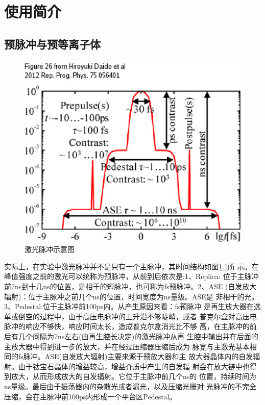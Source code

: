 

\chapter{使用简介}
\label{chap:guide}

\section{预脉冲与预等离子体}
\begin{figure}[!htbp]
  \centering
  \includegraphics[width=\MyFactor\textwidth]{Img/prepulse2012.eps}
  \caption{激光脉冲示意图}
  \label{fig:prepulse2012}
\end{figure}

实际上，在实验中激光脉冲并不是只有一个主脉冲，其时间结构如图\ref{fig:prepulse2012}所
示。在峰值强度之前的激光可以统称为预脉冲，从前到后依次是:1、Replica:
位于主脉冲前7ns到十几ns的位置，是相干的短脉冲，也可称为fs预脉冲。2、ASE
(自发放大辐射)：位于主脉冲之前几个ns的位置，时间宽度为ns量级。ASE是
非相干的光。3、Pedestal:位于主脉冲前100ps内。从产生原因来看：fs预脉冲
是再生放大器在选单或倒空的过程中，由于高压电脉冲的上升沿不够陡峭，或者
普克尔盒对高压电脉冲的响应不够快，响应时间太长，造成普克尔盒消光比不够
高，在主脉冲的前后有几个间隔为7ns左右(由再生腔长决定)的激光脉冲从再
生腔中输出并在后面的主放大器中得到进一步的放大，并在经过压缩器压缩后成为
脉宽与主激光基本相同的fs脉冲。ASE(自发放大辐射)主要来源于预放大器和主
放大器晶体内的自发辐射。由于钛宝石晶体的增益较高，增益介质中产生的自发辐
射会在放大链中也得到放大，从而形成放大的自发辐射。它位于主脉冲前几个ns的
位置，持续时间为ns量级。最后由于振荡器内的杂散光或者漏光，以及压缩光栅对
光脉冲的不完全压缩，会在主脉冲前100ps内形成一个平台区Pedestal。


